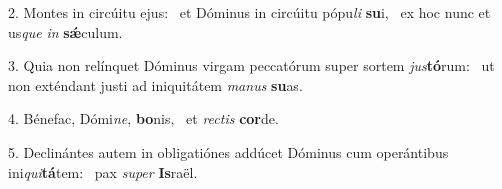 2. Montes in circúitu ejus: \dag\  et Dóminus in circúitu pópu\textit{li} \textbf{su}i, \ast\  ex hoc nunc et us\textit{que} \textit{in} \textbf{sǽ}culum.\

3. Quia non relínquet Dóminus virgam peccatórum super sortem \textit{jus}\textbf{tó}rum: \ast\  ut non exténdant justi ad iniquitátem \textit{ma}\textit{nus} \textbf{su}as.\

4. Bénefac, Dómi\textit{ne}, \textbf{bo}nis, \ast\  et \textit{rec}\textit{tis} \textbf{cor}de.\

5. Declinántes autem in obligatiónes addúcet Dóminus cum operántibus ini\textit{qui}\textbf{tá}tem: \ast\  pax \textit{su}\textit{per} \textbf{Is}raël.\

